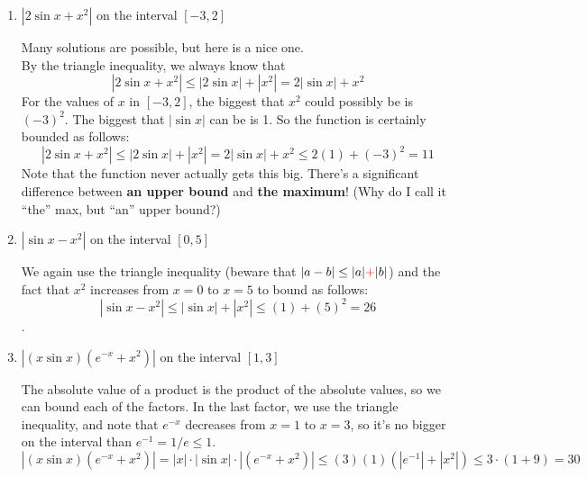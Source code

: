\documentclass[main]{subfiles}
\begin{document}
\begin{enumerate}

\begin{enumerate}
	\item
  \begin{problem}[\vfill]
  $| 2\sin x + x^{2}| $   on the interval $[-3, 2]$
  \end{problem}
  
  \begin{solution}
  Many solutions are possible, but here is a nice one.\\
  By the triangle inequality, we always know that $$|2\sin x + x^2 | \leq |2\sin x| + |x^2| = 2|\sin x| + x^2$$
  For the values of $x$ in $[-3,2]$, the biggest that $x^2$ could possibly be is $(-3)^2$.  The biggest that $|\sin x|$ can be is 1.   So the function is certainly bounded as follows:
  $$|2\sin x + x^2 | \leq |2\sin x| + |x^2| = 2|\sin x| + x^2 \leq 2(1) + (-3)^2 = \boxed{11}$$
  Note that the function never actually gets this big.  There's a significant difference between \textbf{an upper bound} and \textbf{the maximum}! (Why do I call it ``the'' max, but ``an'' upper bound?)
  \end{solution}


  \item
  \begin{problem}[\vfill]
  $| \sin x  - x^{2}| $    on the interval $[0, 5]$
  \end{problem}

  \begin{solution}
  We again use the triangle inequality (beware that $|a-b|\leq |a| {\color{red}+} |b|$) and the fact that $x^2$ increases from $x=0$ to $x=5$ to bound as follows:
  $$| \sin x  - x^{2}| \leq |\sin x | + |x^2| \leq (1) + (5)^2 = \boxed{26}$$.
  \end{solution}

  \item
  \begin{problem}[\vfill]
  $|(x\sin x)(e^{-x} + x^{2})|$    on the interval $[1, 3]$
  \end{problem}

  \begin{solution} The absolute value of a product is the product of the absolute values, so we can bound each of the factors.  In the last factor, we use the triangle inequality, and note that $e^{-x}$ decreases from $x=1$ to $x=3$, so it's no bigger on the interval than $e^{-1} = 1/e  \leq 1$.
  $$ |(x\sin x)(e^{-x} + x^{2})| =  |x|\cdot|\sin x|\cdot|(e^{-x} + x^{2})|\leq (3) (1)(|e^{-1}| + |x^2|) \leq 3\cdot ( 1 + 9 ) = \boxed{30}$$
  \end{solution}



\end{enumerate}
\end{enumerate}
\end{document}
